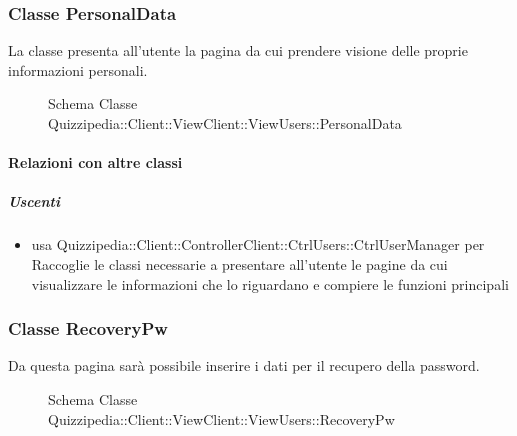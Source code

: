 \subsubsection{Classe PersonalData}
La classe presenta all'utente la pagina da cui prendere visione delle proprie informazioni personali.
\begin{figure}[H]
\centering
\noindent{}
\caption[Schema Classe PersonalData]{Schema Classe Quizzipedia::Client::ViewClient::ViewUsers::PersonalData}
\end{figure}
\paragraph{Relazioni con altre classi}
\subparagraph{Uscenti}
\begin{itemize}
\item usa Quizzipedia::Client::ControllerClient::CtrlUsers::CtrlUserManager per Raccoglie le classi necessarie a presentare all'utente le pagine da cui visualizzare le informazioni che lo riguardano e compiere le funzioni principali
\end{itemize}
\subsubsection{Classe RecoveryPw}
Da questa pagina sarà possibile inserire i dati per il recupero della password.
\begin{figure}[H]
\centering
\noindent{}
\caption[Schema Classe RecoveryPw]{Schema Classe Quizzipedia::Client::ViewClient::ViewUsers::RecoveryPw}
\end{figure}
